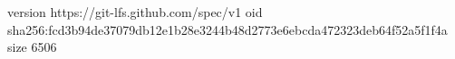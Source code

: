 version https://git-lfs.github.com/spec/v1
oid sha256:fcd3b94de37079db12e1b28e3244b48d2773e6ebcda472323deb64f52a5f1f4a
size 6506
